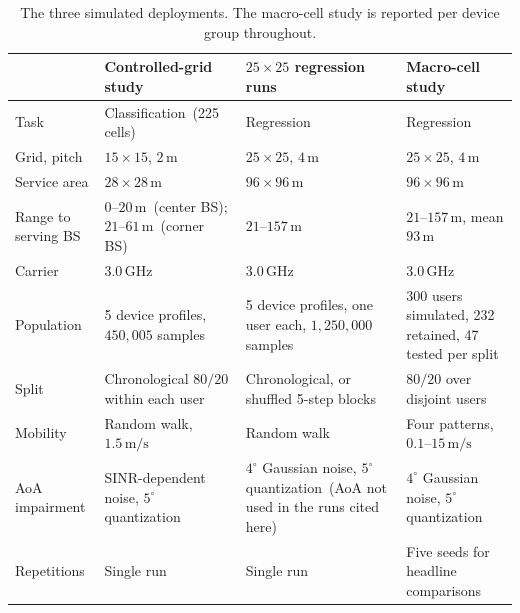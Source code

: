 \begin{table}[h]
  \centering
  \caption{The three simulated deployments. The macro-cell study is reported per device group throughout.}
  \label{tab:studies}
  \small
  \begin{tabularx}{\textwidth}{@{}lXXX@{}}
    \toprule
     & Controlled-grid study & $25\times25$ regression runs & Macro-cell study \\
    \midrule
    Task & Classification~(225 cells) & Regression & Regression \\
    Grid, pitch & $15\times15$, $2\,\text{m}$ & $25\times25$, $4\,\text{m}$ & $25\times25$, $4\,\text{m}$ \\
    Service area & $28\times28\,\text{m}$ & $96\times96\,\text{m}$ & $96\times96\,\text{m}$ \\
    Range to serving BS & $0$--$20\,\text{m}$~(center BS); $21$--$61\,\text{m}$~(corner BS) & $21$--$157\,\text{m}$ & $21$--$157\,\text{m}$, mean $93\,\text{m}$ \\
    Carrier & $3.0\,\text{GHz}$ & $3.0\,\text{GHz}$ & $3.0\,\text{GHz}$ \\
    Population & 5 device profiles, $450{,}005$ samples & 5 device profiles, one user each, $1{,}250{,}000$ samples & 300 users simulated, 232 retained, 47 tested per split \\
    Split & Chronological $80/20$ within each user & Chronological, or shuffled 5-step blocks & $80/20$ over disjoint users \\
    Mobility & Random walk, $1.5\,\text{m/s}$ & Random walk & Four patterns, $0.1$--$15\,\text{m/s}$ \\
    AoA impairment & SINR-dependent noise, $5^\circ$ quantization & $4^\circ$ Gaussian noise, $5^\circ$ quantization~(AoA not used in the runs cited here) & $4^\circ$ Gaussian noise, $5^\circ$ quantization \\
    Repetitions & Single run & Single run & Five seeds for headline comparisons \\
    \bottomrule
  \end{tabularx}
\end{table}

